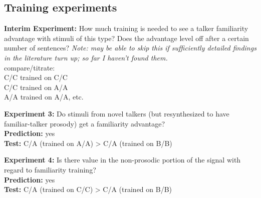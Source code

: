 \subsection{Training experiments}
{\bfseries Interim Experiment:} How much training is needed to see a talker familiarity advantage with stimuli of this type?  Does the advantage level off after a certain number of sentences? \textit{Note: may be able to skip this if sufficiently detailed findings in the literature turn up; so far I haven’t found them.}\\compare/titrate:\\C/C trained on C/C\\C/C trained on A/A\\A/A trained on A/A, etc.

{\bfseries Experiment 3:} Do stimuli from novel talkers (but resynthesized to have familiar-talker prosody) get a familiarity advantage?\\
{\bfseries Prediction:} yes\\
{\bfseries Test:} C/A (trained on A/A) > C/A (trained on B/B)

{\bfseries Experiment 4:} Is there value in the non-prosodic portion of the signal with regard to familiarity training?\\
{\bfseries Prediction:} yes\\
{\bfseries Test:} C/A (trained on C/C) > C/A (trained on B/B)
